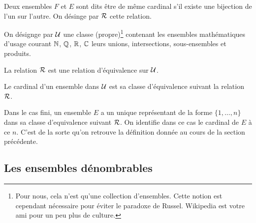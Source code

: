 \documentclass[12pt, a4paper]{article}
\begin{document}
\begin{defn}
  Deux ensembles $F$ et $E$ sont dits être de même cardinal s'il
  existe une bijection de l'un sur l'autre. On désinge par $\mathcal{R}$
  cette relation.
\end{defn}
\noindent On désignge par $\mathcal{U}$ une classe (propre)\footnote{Pour
  nous, cela n'est qu'une collection d'ensembles. Cette notion est
  cependant nécessaire pour éviter le paradoxe de Russel. Wikipedia
  est votre ami pour un peu plus de culture.} contenant les ensembles
mathématiques d'usage courant $\mathbb{N}$, $\mathbb{Q}$, $\mathbb{R}$, $\mathbb{C}$ leurs unions,
intersections, sous-ensembles et produits.
\begin{prop}
  La relation $\mathcal{R}$ est une relation d'équivalence sur $\mathcal{U}$.
\end{prop}
\begin{defn}
  Le cardinal d'un ensemble dans $\mathcal{U}$ est sa classe d'équivalence
  suivant la relation $\mathcal{R}$.
\end{defn}
\begin{rem}
  Dans le cas fini, un ensemble $E$ a un unique représentant de la
  forme $\{1, \ldots, n\}$ dans sa classe d'equivalence suivant
  $\mathcal{R}$. On identifie dans ce cas le cardinal de $E$ à ce
  $n$. C'est de la sorte qu'on retrouve la définition donnée au cours
  de la section précédente.
\end{rem}

\subsection{Les ensembles dénombrables}
\end{document}
